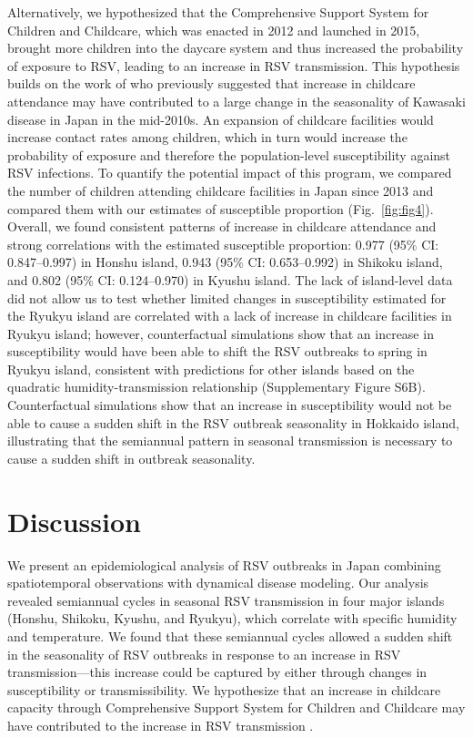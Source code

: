 \documentclass[12pt]{article}
\newcommand{\fref}[1]{Fig.~\ref{fig:#1}}
\begin{document}
Alternatively, we hypothesized that the Comprehensive Support System for Children and Childcare, which was enacted in 2012 and launched in 2015, brought more children into the daycare system and thus increased the probability of exposure to RSV, leading to an increase in RSV transmission.
This hypothesis builds on the work of \cite{dehaan2024age} who previously suggested that increase in childcare attendance may have contributed to a large change in the seasonality of Kawasaki disease in Japan in the mid-2010s.
An expansion of childcare facilities would increase contact rates among children, which in turn would increase the probability of exposure and therefore the population-level susceptibility against RSV infections.
To quantify the potential impact of this program, we compared the number of children attending childcare facilities in Japan since 2013 and compared them with our estimates of susceptible proportion (\fref{fig4}).
Overall, we found consistent patterns of increase in childcare attendance and strong correlations with the estimated susceptible proportion: 0.977 (95\% CI: 0.847--0.997) in Honshu island, 0.943 (95\% CI: 0.653--0.992) in Shikoku island, and 0.802 (95\% CI: 0.124--0.970) in Kyushu island.
The lack of island-level data did not allow us to test whether limited changes in susceptibility estimated for the Ryukyu island are correlated with a lack of increase in childcare facilities in Ryukyu island;
however, counterfactual simulations show that an increase in susceptibility would have been able to shift the RSV outbreaks to spring in Ryukyu island, consistent with predictions for other islands based on the quadratic humidity-transmission relationship (Supplementary Figure S6B).
Counterfactual simulations show that an increase in susceptibility would not be able to cause a sudden shift in the RSV outbreak seasonality in Hokkaido island, illustrating that the semiannual pattern in seasonal transmission is necessary to cause a sudden shift in outbreak seasonality.

\section*{Discussion}

We present an epidemiological analysis of RSV outbreaks in Japan combining spatiotemporal observations with dynamical disease modeling.
Our analysis revealed semiannual cycles in seasonal RSV transmission in four major islands (Honshu, Shikoku, Kyushu, and Ryukyu), which correlate with specific humidity and temperature.
We found that these semiannual cycles allowed a sudden shift in the seasonality of RSV outbreaks in response to an increase in RSV transmission---this increase could be captured by either through changes in susceptibility or transmissibility.
We hypothesize that an increase in childcare capacity through Comprehensive Support System for Children and Childcare may have contributed to the increase in RSV transmission \citep{dehaan2024age}.
\end{document}
